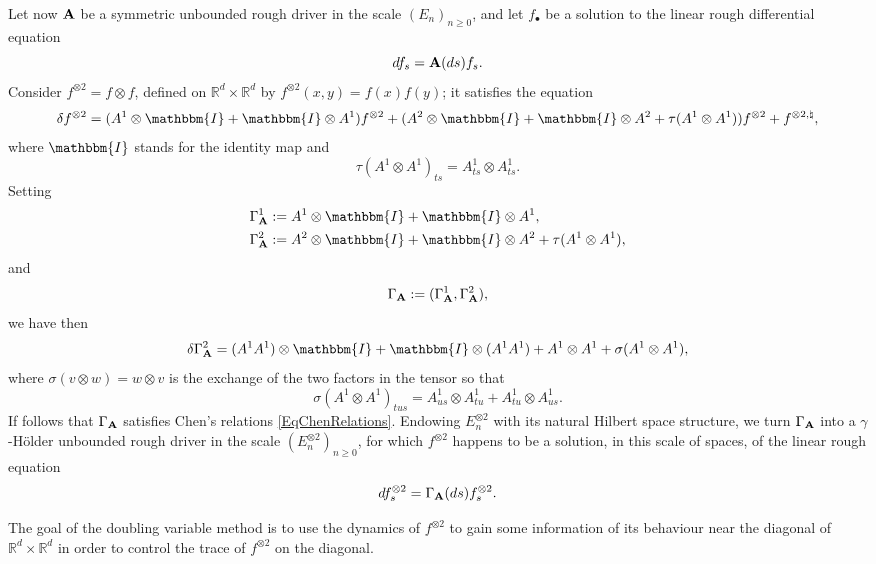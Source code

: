 \documentclass[11pt,a4paper]{amsart}
\newcommand{\RR}{\mathbb{R}}  \newcommand{\CC}{\mathbb{C}}  \newcommand{\LL}{\mathbb{L}}  \newcommand{\WW}{\mathbb{W}}
\renewcommand{\geq}{\geqslant}
\theoremstyle{plain}%
\theoremstyle{definition}
\theoremstyle{remark}
\numberwithin{equation}{section} %
\begin{document}
\bigskip 
 
Let now $\bf A$ be a symmetric unbounded rough driver in the scale $(E_n)_{n\geq 0}$, and let $f_\bullet$ be a solution to the linear rough differential equation 
$$ 
df_s = {\bf A}(ds)f_s.
$$
Consider $f^{\otimes 2} = f \otimes f$, defined on $\RR^d\times\RR^d$ by
$
f^{\otimes 2}(x,y) = f(x)f(y)
$; 
it satisfies the equation
$$ 
\delta f^{\otimes 2} = ( A^1  \otimes \mathbbm{I}+\mathbbm{I} \otimes A^1 ) f^{\otimes 2} + (A^2 \otimes \mathbbm{I}+\mathbbm{I} \otimes A^2 + \tau (A^1 \otimes A^1)) f^{\otimes 2} + f^{\otimes 2, \natural},
$$
where $\mathbbm{I}$ stands for the identity map and
$$
\tau (A^1 \otimes A^1)_{t s} = A^1_{t s} \otimes A^1_{t s}.
$$
Setting 
\begin{equation*}
\begin{split}
&\Gamma_{\bfA}^1 := A^1  \otimes \mathbbm{I}+\mathbbm{I} \otimes A^1, \\
&\Gamma_{\bfA}^2 := A^2 \otimes \mathbbm{I}+\mathbbm{I} \otimes A^2 + \tau (A^1 \otimes A^1),
\end{split}
\end{equation*}
and 
$$
\Gamma_{\bf A} := (\Gamma_{\bf A}^1, \Gamma_{\bf A}^2), 
$$ 
we have then 
$$
\delta \Gamma_{\bfA}^2 = (A^1 A^1) \otimes \mathbbm{I}+\mathbbm{I} \otimes (A^1 A^1) + A^1 \otimes A^1 + \sigma (A^1 \otimes A^1),
$$ 
where $\sigma (v \otimes w) = w \otimes v$ is the exchange of the two factors in the tensor so that 
$$
\sigma (A^1 \otimes A^1)_{t u s} = A^1_{us} \otimes A^1_{tu} + A^1_{tu} \otimes A^1_{us}.
$$ 
If follows that $\Gamma_{\bf A}$ satisfies Chen's relations \eqref{EqChenRelations}. Endowing $E_n^{\otimes 2}$ with its natural Hilbert space structure, we turn $\Gamma_{\bf A}$ into a $\gamma$-H\"older unbounded rough driver in the scale $(E_n^{\otimes 2})_{n \geq 0}$, for which $f^{\otimes 2}$ happens to be a solution, in this scale of spaces, of the linear rough equation
$$
df^{\otimes 2}_s = \Gamma_{\bf A}(ds)f^{\otimes 2}_s. 
$$

\smallskip 

The goal of the doubling variable method is to use the dynamics of $f^{\otimes 2}$ to gain some information of its behaviour near the diagonal of $\RR^d \times \RR^d$ in order to control the trace of $f^{\otimes 2}$ on the diagonal. 
\end{document}
